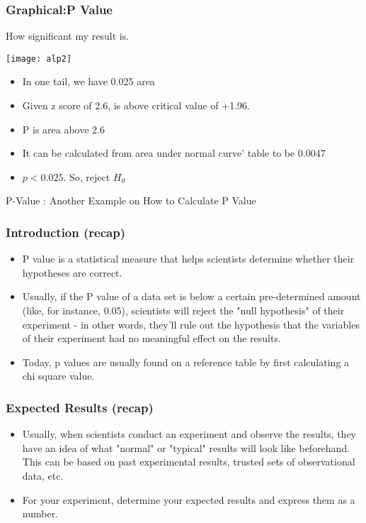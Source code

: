 \begin{frame}
\frametitle{Graphical:P Value}
How significant my result is.
\begin{center}
\texttt{[image: alp2]}
\end{center}

\begin{itemize}
\item  In one tail, we have 0.025 area
\item Given z score of 2.6, is above critical value of +1.96.
\item P is area above 2.6
\item It can be calculated from area under normal curve' table to be 0.0047
\item $ p < 0.025$. So, reject $H_0$
\end{itemize}
\end{frame}

\begin{frame}
\begin{center}
{\Large P-Value : Another Example on How to Calculate P Value}
\end{center}
\end{frame}

\begin{frame}
\frametitle{Introduction (recap)}

\begin{itemize}
\item P value is a statistical measure that helps scientists determine whether their hypotheses are correct.
\item Usually, if the P value of a data set is below a certain pre-determined amount (like, for instance, 0.05), scientists will reject the "null hypothesis" of their experiment - in other words, they'll rule out the hypothesis that the variables of their experiment had no meaningful effect on the results. 
\item Today, p values are usually found on a reference table by first calculating a chi square value.

\end{itemize}
\end{frame}

\begin{frame}
\frametitle{Expected Results (recap)}

\begin{itemize}
\item Usually, when scientists conduct an experiment and observe the results, they have an idea of what "normal" or "typical" results will look like beforehand. This can be based on past experimental results, trusted sets of observational data, etc.
\item For your experiment, determine your expected results and express them as a number.
\end{itemize}
\end{frame}

